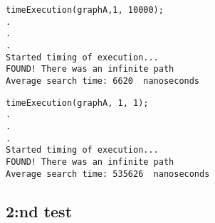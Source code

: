 \documentclass[]{article}
\begin{document}
\begin{lstlisting}
timeExecution(graphA,1, 10000);
.
.
.
Started timing of execution...
FOUND! There was an infinite path
Average search time: 6620  nanoseconds
\end{lstlisting}

\begin{lstlisting}
timeExecution(graphA, 1, 1);
.
.
.
Started timing of execution...
FOUND! There was an infinite path
Average search time: 535626  nanoseconds
\end{lstlisting}



\subsection*{2:nd test}
\end{document}
